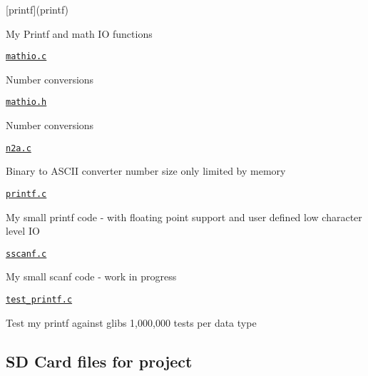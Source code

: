 \begin{DoxyItemize}
\item \mbox{[}printf\mbox{]}(printf)
\begin{DoxyItemize}
\item My Printf and math IO functions
\item \href{printf/mathio.c}{\tt mathio.\+c}
\begin{DoxyItemize}
\item Number conversions
\end{DoxyItemize}
\item \href{printf/mathio.h}{\tt mathio.\+h}
\begin{DoxyItemize}
\item Number conversions
\end{DoxyItemize}
\item \href{printf/n2a.c}{\tt n2a.\+c}
\begin{DoxyItemize}
\item Binary to A\+S\+C\+II converter number size only limited by memory
\end{DoxyItemize}
\item \href{printf/printf.c}{\tt printf.\+c}
\begin{DoxyItemize}
\item My small printf code -\/ with floating point support and user defined low character level IO
\end{DoxyItemize}
\item \href{printf/sscanf.c}{\tt sscanf.\+c}
\begin{DoxyItemize}
\item My small scanf code -\/ work in progress
\end{DoxyItemize}
\item \href{printf/test_printf.c}{\tt test\+\_\+printf.\+c}
\begin{DoxyItemize}
\item Test my printf against glibs 1,000,000 tests per data type
\end{DoxyItemize}
\end{DoxyItemize}
\end{DoxyItemize}

\subsection*{SD Card files for project}


